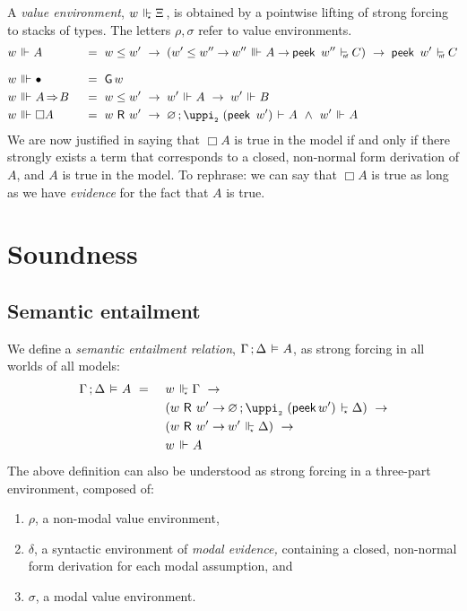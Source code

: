 \documentclass[submission,copyright,creativecommons,sharealike,backref=page]{eptcs}
\newcommand{\Xis}{\rlap{$\Xi$}\hphantom{A}}
\newcommand{\R}{\mathrel{\rlap{$\mkern.75mu\textsf{R}$}\hphantom{\subseteq}}}
\renewcommand{\:}{\mathop{\mkern3mu:\mkern3mu}}
\renewcommand{\.}{\mathop{\mkern3mu.\mkern3mu}}
\renewcommand{\;}{\mathop{;}}
\renewcommand{\,}{\mathop{,}}
\newcommand{\conj}{\mathrel{\wedge}}
\newcommand{\e}{\mathrel{\mkern2mu\vdash\mkern1mu}}
\newcommand{\enf}{\mathrel{\mkern2mu\vdash_{\mkern-9mu\scriptscriptstyle{\textsf{nf}}}}}
\newcommand{\es}{\mathrel{\mkern2mu\vdash_{\mkern-9mu\scriptscriptstyle{\star}}}}
\newcommand{\ee}{\mathrel{\mkern2mu\Vdash\mkern1mu}}
\newcommand{\ees}{\mathrel{\mkern2mu\Vdash_{\mkern-9mu\scriptscriptstyle{\star}}}}
\newcommand{\eee}{\mathrel{\mkern2mu\Vvdash\mkern1mu}}
\newcommand{\ef}{\mathrel{\mkern2mu\vDash\mkern1mu}}
\renewcommand{\r}{\mathrel{\rightarrow\mkern-1mu}}
\newcommand{\rf}{\mathop{\Rightarrow\mkern-1mu}}
\newcommand{\peek}{\operatorname{\textsf{peek}}}
\newcommand{\piii}{\operatorname{\uppi_{\scriptscriptstyle{2}}}}
\newcommand{\G}{\operatorname{\textsf{G}}}
\newcommand{\base}{\mathop{\bullet}}
\renewcommand{\O}{\varnothing}
\theoremstyle{mystyle}
\begin{document}
A \emph{value environment}, $w \ees \Xis$, is obtained by a pointwise lifting of strong forcing to stacks of types.  The letters $\rho, \sigma$ refer to value environments.
\begin{alignat*}{2}
  & w \ee A        && ~=~ w \le w' ~\r~ (w' \le w'' \r w'' \eee A \r \peek~w'' \enf C) ~\r~ \peek~w' \enf C\\[.5\baselineskip]
  & w \eee \base   && ~=~ \G w\\
  & w \eee A \rf B && ~=~ w \le w' ~\r~ w' \ee A ~\r~ w' \ee B\\
  & w \eee \Box A  && ~=~ w \R w' ~\r~ \O \; \piii~(\peek~w') \e A~\conj~w' \ee A
\end{alignat*}
We are now justified in saying that $\Box A$ is true in the model if and only if there strongly exists a term that corresponds to a closed, non-normal form derivation of $A$, and $A$ is true in the model.  To rephrase: we can say that $\Box A$ is true as long as we have \emph{evidence} for the fact that $A$ is true.


\section{Soundness}\label{Soundness}

\subsection{Semantic entailment}

We define a \emph{semantic entailment relation}, $\Gamma \; \Delta \ef A$, as strong forcing in all worlds of all models:
\begin{alignat*}{2}
  & \Gamma \; \Delta \ef A ~=~ && w \ees \Gamma ~\r\\
  &                            && (w \R w' \r \O \; \piii~(\peek w') \es \Delta) ~\r\\
  &                            && (w \R w' \r w' \ees \Delta) ~\r\\
  &                            && w \ee A
\end{alignat*}
The above definition can also be understood as strong forcing in a three-part environment, composed of:
\begin{enumerate}
  \item $\rho$, a non-modal value environment,
  \item $\delta$, a syntactic environment of \emph{modal evidence,} containing a closed, non-normal form derivation for each modal assumption, and
  \item $\sigma$, a modal value environment.
\end{enumerate}
\end{document}
